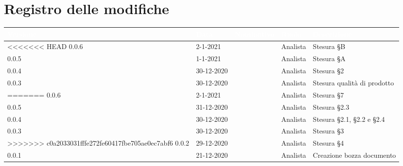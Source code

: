 \section*{Registro delle modifiche}
\setcounter{table}{-1}
{
\renewcommand{\arraystretch}{1.5}
\centering
\begin{longtable}{C{1.7cm} C{2.5cm} C{3.2cm} C{2.7cm} C{4.8cm}}
\textcolor{white}{\textbf{Versione}}&
\textcolor{white}{\textbf{Data}}&
\textcolor{white}{\textbf{Nominativo}}&
\textcolor{white}{\textbf{Ruolo}}&
\textcolor{white}{\textbf{Descrizione}}\\	
\endhead

<<<<<<< HEAD
0.0.6 & 2-1-2021 & \RA{} & Analista & Stesura \S B \\
0.0.5 & 1-1-2021 & \PA{} & Analista & Stesura \S A \\
0.0.4 & 30-12-2020 & \PA{} & Analista & Stesura \S 2 \\
0.0.3 & 30-12-2020 & \ZM{} & Analista & Stesura qualità di prodotto\\
=======
0.0.6 & 2-1-2021 & \BM{} & Analista & Stesura \S 7 \\
0.0.5 & 31-12-2020 & \BM{} & Analista & Stesura \S 2.3 \\
0.0.4 & 30-12-2020 & \PA{} & Analista & Stesura \S 2.1, \S 2.2 e \S 2.4 \\
0.0.3 & 30-12-2020 & \ZM{} & Analista & Stesura \S 3\\
>>>>>>> c0a2033031fffe272fe60417fbe705ae0ec7abf6
0.0.2 & 29-12-2020 & \RA{} & Analista & Stesura \S 4 \\
0.0.1 & 21-12-2020 & \ZM{} & Analista & Creazione bozza documento \\	
\end{longtable}
}
